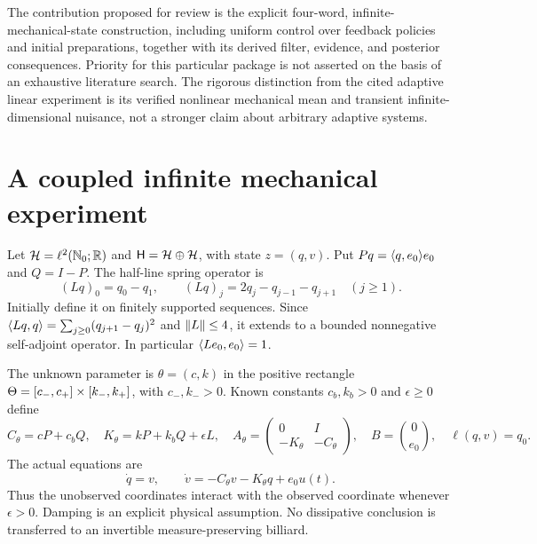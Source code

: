 The contribution proposed for review is the explicit four-word, infinite-mechanical-state construction, including uniform control over feedback policies and initial preparations, together with its derived filter, evidence, and posterior consequences. Priority for this particular package is not asserted on the basis of an exhaustive literature search. The rigorous distinction from the cited adaptive linear experiment is its verified nonlinear mechanical mean and transient infinite-dimensional nuisance, not a stronger claim about arbitrary adaptive systems.

\section{A coupled infinite mechanical experiment}
\label{sec:r35-model}
Let $\mathcal H=\ell^2(\mathbb N_0;\mathbb R)$ and $\mathsf H=\mathcal H\oplus\mathcal H$, with state $z=(q,v)$. Put $Pq=\langle q,e_0\rangle e_0$ and $Q=I-P$. The half-line spring operator is
\[
 (Lq)_0=q_0-q_1,\qquad (Lq)_j=2q_j-q_{j-1}-q_{j+1}\quad(j\ge1).
\]
Initially define it on finitely supported sequences. Since
$\langle Lq,q\rangle=\sum_{j\ge0}(q_{j+1}-q_j)^2$ and $\left\|L\right\|\le4$, it extends to a bounded nonnegative self-adjoint operator. In particular $\langle Le_0,e_0\rangle=1$.

The unknown parameter is $\theta=(c,k)$ in the positive rectangle
$\Theta=[c_-,c_+]\times[k_-,k_+]$, with $c_-,k_->0$. Known constants $c_b,k_b>0$ and $\epsilon\ge0$ define
\[
 C_\theta=cP+c_bQ,\quad K_\theta=kP+k_bQ+\epsilon L,\quad
 A_\theta=\begin{pmatrix}0&I\\-K_\theta&-C_\theta\end{pmatrix},\quad
 B=\binom0{e_0},\quad \ell(q,v)=q_0.
\]
The actual equations are
\begin{equation}\label{eq:r35-mechanics}
 \dot q=v,\qquad \dot v=-C_\theta v-K_\theta q+e_0u(t).
\end{equation}
Thus the unobserved coordinates interact with the observed coordinate whenever $\epsilon>0$. Damping is an explicit physical assumption. No dissipative conclusion is transferred to an invertible measure-preserving billiard.

